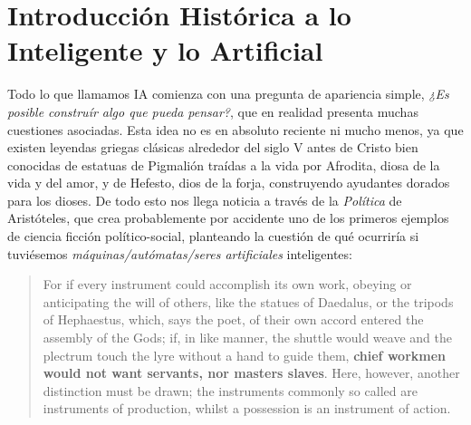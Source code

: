 \documentclass[12pt]{memoir}
\begin{document}
\newpage
\thispagestyle{empty}

\DoubleSpacing




\begin{KeepFromToc}
  \tableofcontents
\end{KeepFromToc}
\newpage



\chapter{Introducción Histórica a lo Inteligente y lo Artificial}

Todo lo que llamamos IA comienza con una pregunta de apariencia simple, \textit{¿Es posible construír algo que pueda pensar?}, que en realidad presenta muchas cuestiones asociadas. Esta idea no es en absoluto reciente ni mucho menos, ya que existen leyendas griegas clásicas alrededor del siglo V antes de Cristo bien conocidas de estatuas de Pigmalión traídas a la vida por Afrodita, diosa de la vida y del amor, y de Hefesto, dios de la forja, construyendo ayudantes dorados para los dioses. De todo esto nos llega noticia a través de la \textit{Política} de Aristóteles, que crea probablemente por accidente uno de los primeros ejemplos de ciencia ficción político-social, planteando la cuestión de qué ocurriría si tuviésemos \textit{máquinas/autómatas/seres artificiales} inteligentes:

\blockquote{For if every instrument could accomplish its own work, obeying or anticipating the will of others, like the statues of Daedalus, or the tripods of Hephaestus, which, says the poet, of their own accord entered the assembly of the Gods; if, in like manner, the shuttle would weave and the plectrum touch the lyre without a hand to guide them, \textbf{chief workmen would not want servants, nor masters slaves}. Here, however, another distinction must be drawn; the instruments commonly so called are instruments of production, whilst a possession is an instrument of action. \parencite{aristotlePolitics}}
\end{document}
